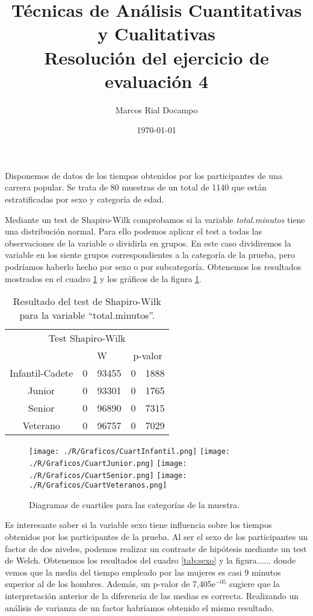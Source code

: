 \documentclass[11pt,a4paper]{article}
\author{Marcos Rial Docampo}
\title{Técnicas de Análisis Cuantitativas y Cualitativas\\Resolución del ejercicio de evaluación 4}
\date{\small{\today}}
\begin{document}
\maketitle

Disponemos de datos de los tiempos obtenidos por los participantes de una carrera popular. Se trata de 80 muestras de un total de 1140 que están estratificadas por sexo y categoría de edad.

Mediante un test de Shapiro-Wilk comprobamos si la variable \textit{total.minutos} tiene una distribución normal. Para ello podemos aplicar el test a todas las observaciones de la variable o dividirla en grupos. En este caso dividiremos la variable en los siente grupos correspondientes a la categoría de la prueba, pero podríamos haberlo hecho por sexo o por subcategoría. Obtenemos los resultados mostrados en el cuadro \ref{tab:Shapiro} y los gráficos de la figura \ref{fig:diagrama}.

\begin{table}[ht]
\centering
\begin{tabular}{cr@{,}lr@{,}l}
\toprule[0.4mm]
\multicolumn{5}{c}{Test Shapiro-Wilk}\\
 & \multicolumn{2}{c}{W} & \multicolumn{2}{c}{p-valor}\\
\midrule
Infantil-Cadete & 0&93455 & 0&1888\\
Junior & 0&93301 & 0&1765\\
Senior & 0&96890 & 0&7315\\
Veterano & 0&96757 & 0&7029\\
\bottomrule[0.4mm]
\end{tabular}
\caption{Resultado del test de Shapiro-Wilk para la variable ``total.minutos''.}
\label{tab:Shapiro}
\end{table}

\begin{figure}
\centering
\texttt{[image: ./R/Graficos/CuartInfantil.png]}
\texttt{[image: ./R/Graficos/CuartJunior.png]}
\texttt{[image: ./R/Graficos/CuartSenior.png]}
\texttt{[image: ./R/Graficos/CuartVeteranos.png]}
\caption{Diagramas de cuartiles para las categorías de la muestra.}
\label{fig:diagrama}
\end{figure}

Es interesante saber si la variable sexo tiene influencia sobre los tiempos obtenidos por los participantes de la prueba. Al ser el sexo de los participantes un factor de dos niveles, podemos realizar un contraste de hipótesis mediante un test de Welch. Obtenemos los resultados del cuadro \ref{tab:sexo} y la figura...... donde vemos que la media del tiempo empleado por las mujeres es casi 9 minutos superior al de los hombres. Además, un p-valor de 7,405e$^{-05}$ sugiere que la interpretación anterior de la diferencia de las medias es correcta. Realizando un análisis de varianza de un factor habríamos obtenido el mismo resultado.
\end{document}
